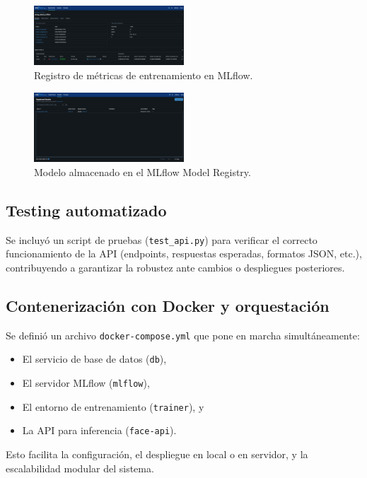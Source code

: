\begin{figure}[h]
\includegraphics[width=0.5\textwidth]{images/mlflow_metrics.jpeg}
\centering
\caption{Registro de métricas de entrenamiento en MLflow.}
\label{fig:mlflow-metrics}
\end{figure}

\begin{figure}[h]
\includegraphics[width=0.5\textwidth]{images/mlflow_register.jpeg}
\centering
\caption{Modelo almacenado en el MLflow Model Registry.}
\label{fig:mlflow-model}
\end{figure}

\subsection{Testing automatizado}
Se incluyó un script de pruebas (\texttt{test\_api.py}) para verificar el correcto funcionamiento de la API (endpoints, respuestas esperadas, formatos JSON, etc.), contribuyendo a garantizar la robustez ante cambios o despliegues posteriores.

\subsection{Contenerización con Docker y orquestación}
Se definió un archivo \texttt{docker-compose.yml} que pone en marcha simultáneamente:
\begin{itemize}
  \item El servicio de base de datos (\texttt{db}),
  \item El servidor MLflow (\texttt{mlflow}),
  \item El entorno de entrenamiento (\texttt{trainer}), y
  \item La API para inferencia (\texttt{face-api}).
\end{itemize}
Esto facilita la configuración, el despliegue en local o en servidor, y la escalabilidad modular del sistema.


